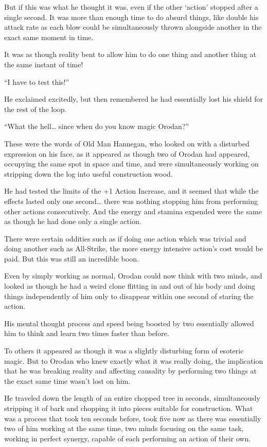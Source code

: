 \documentclass[a4paper,10pt]{book}
\begin{document}
But if this was what he thought it was, even if the other ‘action’ stopped after a single second. It was more than enough time to do absurd things, like double his attack rate as each blow could be simultaneously thrown alongside another in the exact same moment in time.\par
It was as though reality bent to allow him to do one thing and another thing at the same instant of time!\par
“I have to test this!”\par
He exclaimed excitedly, but then remembered he had essentially lost his shield for the rest of the loop.\par
\par
“What the hell… since when do you know magic Orodan?”\par
These were the words of Old Man Hannegan, who looked on with a disturbed expression on his face, as it appeared as though two of Orodan had appeared, occupying the same spot in space and time, and were simultaneously working on stripping down the log into useful construction wood.\par
He had tested the limits of the +1 Action Increase, and it seemed that while the effects lasted only one second… there was nothing stopping him from performing other actions consecutively. And the energy and stamina expended were the same as though he had done only a single action.\par
There were certain oddities such as if doing one action which was trivial and doing another such as All-Strike, the more energy intensive action’s cost would be paid. But this was still an incredible boon.\par
Even by simply working as normal, Orodan could now think with two minds, and looked as though he had a weird clone flitting in and out of his body and doing things independently of him only to disappear within one second of staring the action.\par
His mental thought process and speed being boosted by two essentially allowed him to think and learn two times faster than before.\par
To others it appeared as though it was a slightly disturbing form of esoteric magic. But to Orodan who knew exactly what it was really doing, the implication that he was breaking reality and affecting causality by performing two things at the exact same time wasn’t lost on him.\par
He traveled down the length of an entire chopped tree in seconds, simultaneously stripping it of bark and chopping it into pieces suitable for construction. What was a process that took ten seconds before, took five now as there was essentially two of him working at the same time, two minds focusing on the same task, working in perfect synergy, capable of each performing an action of their own.\par
\end{document}
